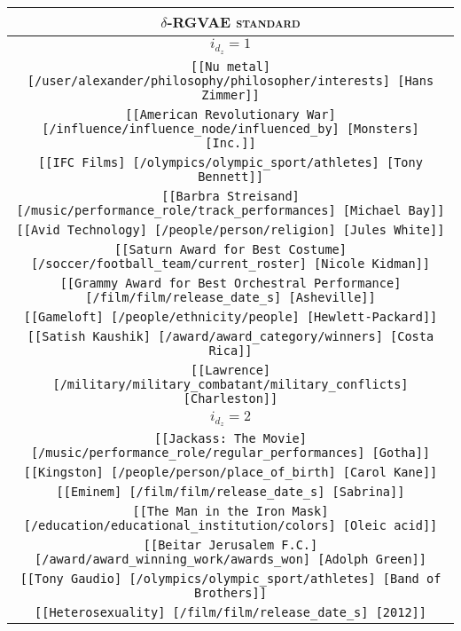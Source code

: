 \begin{longtable}{|c|}
    \hline
    \rowcolor[HTML]{EFEFEF} 
    \textsc{$\delta$-RGVAE standard}\\ \hline
    \hline 
    \rowcolor[HTML]{EFEFEF} 
    \textsc{$i_{d_z}=1$}\\ \hline 
    \texttt{[[Nu metal] [/user/alexander/philosophy/philosopher/interests] [Hans Zimmer]]}\\
    \texttt{[[American Revolutionary War] [/influence/influence\_node/influenced\_by] [Monsters] [Inc.]]}\\
    \texttt{[[IFC Films] [/olympics/olympic\_sport/athletes] [Tony Bennett]]}\\
    \texttt{[[Barbra Streisand] [/music/performance\_role/track\_performances] [Michael Bay]]}\\
    \texttt{[[Avid Technology] [/people/person/religion] [Jules White]]}\\
    \texttt{[[Saturn Award for Best Costume] [/soccer/football\_team/current\_roster] [Nicole Kidman]]}\\
    \texttt{[[Grammy Award for Best Orchestral Performance] [/film/film/release\_date\_s] [Asheville]]}\\
    \texttt{[[Gameloft] [/people/ethnicity/people] [Hewlett-Packard]]}\\
    \texttt{[[Satish Kaushik] [/award/award\_category/winners] [Costa Rica]]}\\
    \texttt{[[Lawrence] [/military/military\_combatant/military\_conflicts] [Charleston]]}\\
    \hline 
    \rowcolor[HTML]{EFEFEF} 
    \textsc{$i_{d_z}=2$}\\ \hline 
    \texttt{[[Jackass: The Movie] [/music/performance\_role/regular\_performances] [Gotha]]}\\
    \texttt{[[Kingston] [/people/person/place\_of\_birth] [Carol Kane]]}\\
    \texttt{[[Eminem] [/film/film/release\_date\_s] [Sabrina]]}\\
    \texttt{[[The Man in the Iron Mask] [/education/educational\_institution/colors] [Oleic acid]]}\\
    \texttt{[[Beitar Jerusalem F.C.] [/award/award\_winning\_work/awards\_won] [Adolph Green]]}\\
    \texttt{[[Tony Gaudio] [/olympics/olympic\_sport/athletes] [Band of Brothers]]}\\
    \texttt{[[Heterosexuality] [/film/film/release\_date\_s] [2012]]}\\

\end{longtable}
